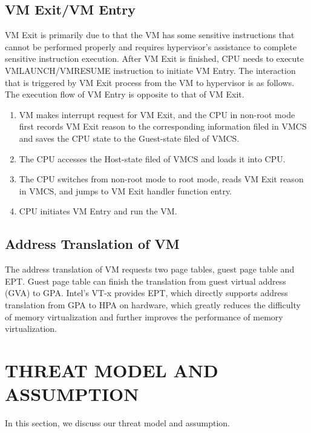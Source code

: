 \documentclass[10pt, numbers, preprint ]{sigplanconf}
\begin{document}
{\subsection{VM Exit/VM Entry} \label{subsec:vmexit}
VM Exit is primarily due to that the VM has some sensitive instructions that cannot be performed properly and requires hypervisor’s assistance to complete sensitive instruction execution. After VM Exit is finished, CPU needs to execute VMLAUNCH/VMRESUME instruction to initiate VM Entry. The interaction that is triggered by VM Exit process from the VM to hypervisor is as follows. The execution flow of VM Entry is opposite to that of VM Exit.
\begin{enumerate}
\item VM makes interrupt request for VM Exit, and the CPU in non-root mode first records VM Exit reason to the corresponding information filed in VMCS and saves the CPU state to the Guest-state filed of VMCS.
\item The CPU accesses the Host-state filed of VMCS and loads it into CPU.
\item The CPU switches from non-root mode to root mode, reads VM Exit reason in VMCS, and jumps to VM Exit handler function entry.
\item CPU initiates VM Entry and run the VM.
\end{enumerate}

\subsection{Address Translation of VM} \label{subsec:addrtrans}%
The address translation of VM requests two page tables, guest page table and EPT. Guest page table can finish the translation from guest virtual address (GVA) to GPA. Intel’s VT-x provides EPT, which directly supports address translation from GPA to HPA on hardware, which greatly reduces the difficulty of memory virtualization and further improves the performance of memory virtualization.


\section{THREAT MODEL AND ASSUMPTION} \label{sec:threatmdasmp}
In this section, we discuss our threat model and assumption.

}
\end{document}
